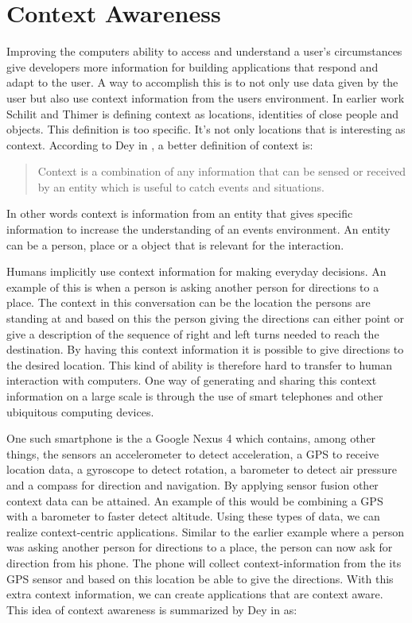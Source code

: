 \section{Context Awareness}
Improving the computers ability to access and understand a user's circumstances give developers more information for building  applications that respond and adapt to the user. A way to accomplish this is to not only use data given by the user but also use context information from the users environment. In earlier work Schilit and Thimer \cite{schilit1994disseminating} is defining context as locations, identities of close people and objects. This definition is too specific. It's not only locations that is interesting as context. According to Dey in \cite{dey2001understanding}, a better definition of context is:

\begin{quotation}
Context is a combination of any information that can be sensed or received by an entity which is useful to catch events and situations. \cite{dey2001understanding}
\end{quotation}

In other words context is information from an entity that gives specific information to increase the understanding of an events environment. An entity can be a person, place or a object that is relevant for the interaction. 

Humans implicitly use context information for making everyday decisions. An example of this is when a person is asking another person for directions to a place. The context in this conversation can be the location the persons are standing at and based on this the person giving the directions can either point or give a description of the sequence of right and left turns needed to reach the destination. By having this context information it is possible to give directions to the desired location. This kind of ability is therefore hard to transfer to human interaction with computers. One way of generating and sharing this context information on a large scale is through the use of smart telephones and other ubiquitous computing devices.

One such smartphone is the a Google Nexus 4 \cite{GoogleNexus} which contains, among other things, the sensors an accelerometer to detect acceleration, a GPS to receive location data, a gyroscope to detect rotation, a barometer to detect air pressure and a compass for direction and navigation. By applying sensor fusion \cite{Elmenreich02sensorfusion} other context data can be attained. An example of this would be combining a GPS with a barometer to faster detect altitude. Using these types of data, we can realize context-centric applications. Similar to the earlier example where a person was asking another person for directions to a place, the person can now ask for direction from his phone. The phone will collect context-information from the its GPS sensor and based on this location be able to give the directions. With this extra context information, we can create applications that are context aware. This idea of context awareness is summarized by Dey in \cite{dey2001understanding} as: 

